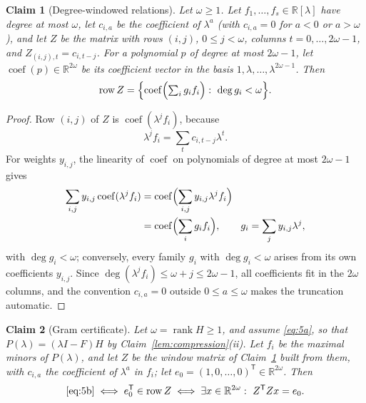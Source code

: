 \documentclass[journal]{IEEEtran}
\theoremstyle{plainn}
\newtheorem{claim}{Claim}
\theoremstyle{remark}
\begin{document}
\begin{claim}[Degree-windowed relations]\label{lem:window}
Let $\omega\ge1$. Let $f_1,\dots,f_s\in\mathbb R[\lambda]$ have degree at most $\omega$,
let $c_{i,a}$ be the coefficient of $\lambda^a$ (with $c_{i,a}=0$ for
$a<0$ or $a>\omega$), and let $Z$ be the matrix with rows $(i,j)$,
$0\le j<\omega$, columns $t=0,\dots,2\omega-1$, and
$Z_{(i,j),t}=c_{i,t-j}$. For a polynomial $p$ of degree at most
$2\omega-1$, let $\operatorname{coef}(p)\in\mathbb R^{2\omega}$ be its
coefficient vector in the basis $1,\lambda,\dots,\lambda^{2\omega-1}$.
Then
\begin{equation}
\operatorname{row}Z=
\Bigl\{
\operatorname{coef}\Bigl(\textstyle\sum_i g_if_i\Bigr)
:\ \deg g_i<\omega
\Bigr\}.
\end{equation}
\end{claim}

\begin{proof}
Row $(i,j)$ of $Z$ is $\operatorname{coef}(\lambda^jf_i)$, because
\begin{equation*}
\lambda^jf_i=\sum_t c_{i,t-j}\lambda^t .
\end{equation*}
For weights $y_{i,j}$, the linearity of $\operatorname{coef}$ on
polynomials of degree at most $2\omega-1$ gives
\begin{equation*}
\begin{aligned}
\sum_{i,j}y_{i,j}\operatorname{coef}(\lambda^jf_i)
&=\operatorname{coef}\Bigl(\sum_{i,j}y_{i,j}\lambda^jf_i\Bigr)\\
&=\operatorname{coef}\Bigl(\sum_i g_if_i\Bigr),
\qquad g_i=\sum_j y_{i,j}\lambda^j,
\end{aligned}
\end{equation*}
with $\deg g_i<\omega$; conversely, every family $g_i$ with
$\deg g_i<\omega$ arises from its own coefficients $y_{i,j}$. Since
$\deg(\lambda^jf_i)\le\omega+j\le2\omega-1$, all coefficients fit in
the $2\omega$ columns, and the convention $c_{i,a}=0$ outside
$0\le a\le\omega$ makes the truncation automatic.
\end{proof}

\begin{claim}[Gram certificate]\label{prop:gram}\label{sec:gram}
Let $\omega=\operatorname{rank}H\ge1$, and assume \eqref{eq:5a}, so that
$P(\lambda)=(\lambda I-F)H$ by Claim~\ref{lem:compression}(ii). Let $f_i$ be the maximal minors of
$P(\lambda)$, and let $Z$ be the window
matrix of Claim~\ref{lem:window} built from them, with $c_{i,a}$ the coefficient of $\lambda^a$
in $f_i$; let $e_0=(1,0,\ldots,0)^{\mathsf T}\in\mathbb R^{2\omega}$. Then
\begin{equation}
\eqref{eq:5b}
\iff e_0^{\mathsf T}\in\operatorname{row}Z
\iff\exists x\in\mathbb R^{2\omega}:\ Z^{\mathsf T}Zx=e_0 .
\end{equation}
\end{claim}
\end{document}
